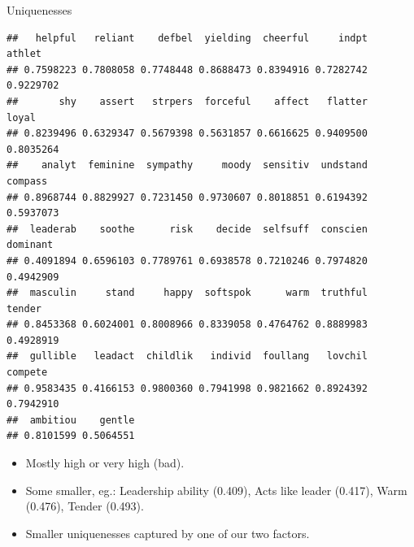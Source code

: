 \begin{frame}[fragile]{Uniquenesses}
  
{\scriptsize  
\begin{knitrout}
\color{fgcolor}\begin{kframe}
\begin{alltt}
\hlopt{$}
\end{alltt}
\begin{verbatim}
##   helpful   reliant    defbel  yielding  cheerful     indpt    athlet 
## 0.7598223 0.7808058 0.7748448 0.8688473 0.8394916 0.7282742 0.9229702 
##       shy    assert   strpers  forceful    affect   flatter     loyal 
## 0.8239496 0.6329347 0.5679398 0.5631857 0.6616625 0.9409500 0.8035264 
##    analyt  feminine  sympathy     moody  sensitiv  undstand   compass 
## 0.8968744 0.8829927 0.7231450 0.9730607 0.8018851 0.6194392 0.5937073 
##  leaderab    soothe      risk    decide  selfsuff  conscien  dominant 
## 0.4091894 0.6596103 0.7789761 0.6938578 0.7210246 0.7974820 0.4942909 
##  masculin     stand     happy  softspok      warm  truthful    tender 
## 0.8453368 0.6024001 0.8008966 0.8339058 0.4764762 0.8889983 0.4928919 
##  gullible   leadact  childlik   individ  foullang   lovchil   compete 
## 0.9583435 0.4166153 0.9800360 0.7941998 0.9821662 0.8924392 0.7942910 
##  ambitiou    gentle 
## 0.8101599 0.5064551
\end{verbatim}
\end{kframe}
\end{knitrout}
}

\begin{itemize}
\item Mostly high or very high (bad).
\item Some smaller, eg.:
  Leadership ability (0.409),
  Acts like leader (0.417),
  Warm (0.476),
  Tender (0.493).
\item Smaller uniquenesses captured by one of our two factors.
\end{itemize}
  
\end{frame}

